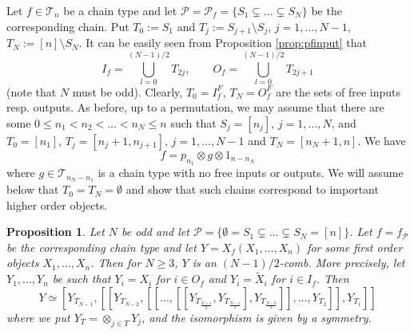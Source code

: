 \documentclass[12pt]{article}
\newtheorem{prop}{Proposition}
\theoremstyle{definition}
\theoremstyle{remark}
\def\Te{\mathcal T}
\def\Pe{\mathcal P}
\begin{document}
Let $f\in \Te_n$ be a chain type and let $\Pe=\Pe_f=\{S_1\subsetneq \dots \subsetneq
S_N\}$ be the corresponding chain. Put $T_0:=S_1$ and $T_j:=S_{j+1}\setminus S_{j}$,
$j=1,\dots, N-1$, $T_{N}:=[n]\setminus S_N$.  It can be easily seen from Proposition \ref{prop:pfinput} that 
\begin{equation}\label{eq:chain_io}
I_f=\bigcup_{l=0}^{(N-1)/2}{T_{2j}}, \qquad O_f=\bigcup_{l=0}^{(N-1)/2}{T_{2j+1}}
\end{equation}
(note that $N$ must be odd). Clearly, $T_0=I_f^F$, $T_{N}=O_f^F$ are the sets of free inputs resp.
outputs. As before, up to a permutation, we may assume that  there are some $0\le
n_1<n_2<\dots<n_{N}\le n$ such that $S_j=[n_j]$, $j=1,\dots,N$, and $T_0=[n_1]$,
$T_j=[n_j+1, n_{j+1}]$, $j=1,\dots, N-1$ and $T_N=[n_N+1,n]$. We have  
\[
f=p_{n_1}\otimes g\otimes 1_{n-n_N}
\]
where $g\in \Te_{n_N-n_1}$ is a chain type with no free inputs or outputs. We will assume below that
$T_0=T_N=\emptyset$ and  show that such chains correspond to important higher order objects. 


\begin{prop}\label{prop:chains_combs}  Let $N$ be odd and let $\Pe=\{\emptyset= S_1\subsetneq \dots
\subsetneq S_N= [n]\}$. Let $f=f_\Pe$ be the corresponding chain type and let
$Y=X_f(X_1,\dots,X_n)$ for some first order objects $X_1,\dots, X_n$. Then for $N\ge 3$, $Y$ is an $(N-1)/2$-comb. 
More precisely, let $Y_1,\dots, Y_n$ be such that $Y_i=X_i$ for $i\in O_f$ and $Y_i=\tilde X_i$ for $i\in I_f$.
Then
\[
Y\simeq
[Y_{T_{N-1}},[[Y_{T_{N-2}},[[\dots,[[Y_{T_{\frac{N+1}2}},Y_{T_{\frac{N-1}2}}],Y_{T_{\frac{N-3}2}}]],\dots,Y_{T_2}]],Y_{T_1}]] 
 \]
 where we put $Y_T=\otimes_{j\in T} Y_j$, 
 and the isomorphism is given by a symmetry.

\end{prop}
\end{document}
